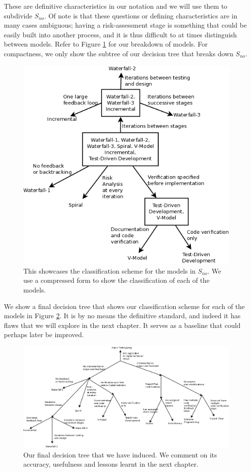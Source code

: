 These are definitive characteristics in our notation and we will use them to
subdivide $S_{no}$.
Of note is that these questions or defining characteristics are in many cases
ambiguous; having a risk-assessment stage is something that could be easily
built into another process, and it is thus difficult to at times distinguish
between models.
Refer to Figure \ref{DecTree4} for our breakdown of models.
For compactness, we only show the subtree of our decision tree that breaks down
$S_{no}$.

\begin{figure}[ht!]
  \includegraphics[scale=0.4]{media/DecisionTree4}
  \caption{This showcases the classification scheme for the models in $S_{no}$.
  We use a compressed form to show the classification of each of the models.}
  \label{DecTree4}
\end{figure}

We show a final decision tree that shows our classification scheme for each of
the models in Figure \ref{DecTreeFinal}.
It is by no means the definitive standard, and indeed it has flaws that we will
explore in the next chapter.
It serves as a baseline that could perhaps later be improved.

\begin{figure}[ht!]
  \includegraphics[angle=90,scale=0.4]{media/DecisionTreeFinal}
  \caption{Our final decision tree that we have induced. We comment on its
  accuracy, usefulness and lessons learnt in the next chapter.}
  \label{DecTreeFinal}
\end{figure}
